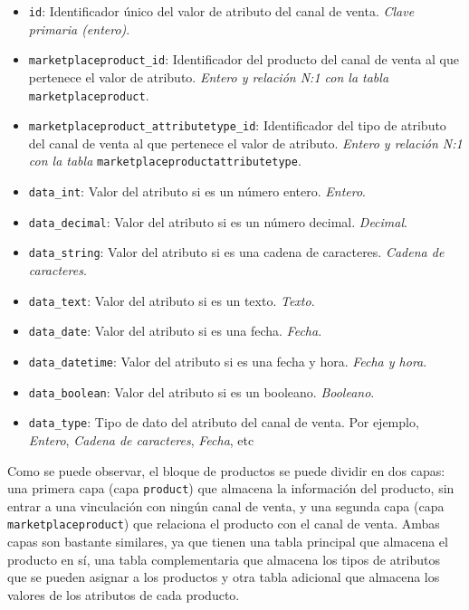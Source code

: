 \begin{itemize}
          \begin{itemize}
              \item \texttt{id}: Identificador único del valor de atributo del canal de venta. \textit{Clave primaria (entero)}.
              \item \texttt{marketplaceproduct\_id}: Identificador del producto del canal de venta al que pertenece el valor de atributo. \textit{Entero y relación N:1 con la tabla} \texttt{marketplaceproduct}.
              \item \texttt{marketplaceproduct\_attributetype\_id}: Identificador del tipo de atributo del canal de venta al que pertenece el valor de atributo. \textit{Entero y relación N:1 con la tabla} \texttt{marketplaceproductattributetype}.
              \item \texttt{data\_int}: Valor del atributo si es un número entero. \textit{Entero}.
              \item \texttt{data\_decimal}: Valor del atributo si es un número decimal. \textit{Decimal}.
              \item \texttt{data\_string}: Valor del atributo si es una cadena de caracteres. \textit{Cadena de caracteres}.
              \item \texttt{data\_text}: Valor del atributo si es un texto. \textit{Texto}.
              \item \texttt{data\_date}: Valor del atributo si es una fecha. \textit{Fecha}.
              \item \texttt{data\_datetime}: Valor del atributo si es una fecha y hora. \textit{Fecha y hora}.
              \item \texttt{data\_boolean}: Valor del atributo si es un booleano. \textit{Booleano}.
              \item \texttt{data\_type}: Tipo de dato del atributo del canal de venta. Por ejemplo, \textit{Entero}, \textit{Cadena de caracteres}, \textit{Fecha}, etc
          \end{itemize}
\end{itemize}

Como se puede observar, el bloque de productos se puede dividir en dos capas: una primera capa (capa  \texttt{product}) que almacena la información del producto, sin entrar a una vinculación con ningún canal de venta, y una segunda capa (capa  \texttt{marketplaceproduct}) que relaciona el producto con el canal de venta. Ambas capas son bastante similares, ya que tienen una tabla principal que almacena el producto en sí, una tabla complementaria que almacena los tipos de atributos que se pueden asignar a los productos y otra tabla adicional que almacena los valores de los atributos de cada producto.

